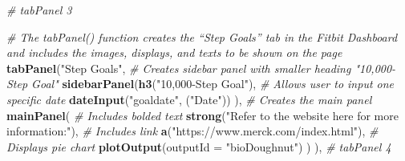 \documentclass[]{book}
\newenvironment{Shaded}{\begin{snugshade}}{\end{snugshade}}
\newcommand{\KeywordTok}[1]{\textcolor[rgb]{0.13,0.29,0.53}{\textbf{#1}}}
\newcommand{\DataTypeTok}[1]{\textcolor[rgb]{0.13,0.29,0.53}{#1}}
\newcommand{\StringTok}[1]{\textcolor[rgb]{0.31,0.60,0.02}{#1}}
\newcommand{\CommentTok}[1]{\textcolor[rgb]{0.56,0.35,0.01}{\textit{#1}}}
\newcommand{\NormalTok}[1]{#1}
\begin{document}
\begin{Shaded}
\begin{Highlighting}[]
{{             \CommentTok{# tabPanel 3}
             
             \CommentTok{# The tabPanel() function creates the “Step Goals” tab in the Fitbit Dashboard and includes the images, displays, and texts to be shown on the page}
             \KeywordTok{tabPanel}\NormalTok{(}\StringTok{"Step Goals"}\NormalTok{,}
                      \CommentTok{# Creates sidebar panel with smaller heading "10,000-Step Goal"}
                      \KeywordTok{sidebarPanel}\NormalTok{(}\KeywordTok{h3}\NormalTok{(}\StringTok{"10,000-Step Goal"}\NormalTok{),}
                                   \CommentTok{# Allows user to input one specific date}
                                   \KeywordTok{dateInput}\NormalTok{(}\StringTok{"goaldate"}\NormalTok{, (}\StringTok{"Date"}\NormalTok{))}
\NormalTok{                      ),}
                      \CommentTok{# Creates the main panel}
                      \KeywordTok{mainPanel}\NormalTok{(}
                        \CommentTok{# Includes bolded text}
                        \KeywordTok{strong}\NormalTok{(}\StringTok{"Refer to the website here for more information:"}\NormalTok{),}
                        \CommentTok{# Includes link}
                        \KeywordTok{a}\NormalTok{(}\StringTok{"https://www.merck.com/index.html"}\NormalTok{),}
                        \CommentTok{# Displays pie chart}
                        \KeywordTok{plotOutput}\NormalTok{(}\DataTypeTok{outputId =} \StringTok{"bioDoughnut"}\NormalTok{)}
\NormalTok{                      )}
\NormalTok{             ),}
             \CommentTok{# tabPanel 4}
             
}}
\end{Highlighting}
\end{Shaded}
\end{document}
